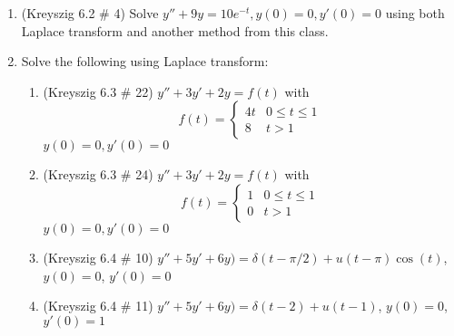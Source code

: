 \documentclass[letterpaper, fontsize=12pt]{scrartcl} %
\numberwithin{equation}{section} %
\numberwithin{figure}{section} %
\numberwithin{table}{section} %
\begin{document}
\begin{enumerate}
\item (Kreyszig 6.2 \# 4) Solve $y'' + 9y  = 10e^{-t}, y(0)=0, y'(0)=0$ using both Laplace transform and another method from this class. 

\item Solve the following using Laplace transform:
\begin{enumerate}
\item (Kreyszig 6.3 \# 22) $y'' +  3y' + 2y = f(t)$ with 
\[ f(t) = \begin{cases} 4t & 0\leq t\leq  1 \\ 8 & t> 1\end{cases}\]
$ y(0)= 0, y'(0) =0$

\item (Kreyszig 6.3 \# 24) $y'' +  3y' + 2y = f(t)$ with
\[ f(t) = \begin{cases} 1 & 0\leq t\leq  1 \\ 0 & t> 1\end{cases}\]
$ y(0)= 0, y'(0) =0$

\item (Kreyszig 6.4 \# 10) $y'' + 5y' + 6y) = \delta(t - \pi/2) + u(t - \pi)\cos(t)$, $y(0) = 0$, $y'(0) = 0$

\item (Kreyszig 6.4 \# 11) $y'' + 5y' + 6y) = \delta(t - 2) + u(t - 1)$, $y(0) = 0$, $y'(0) = 1$


\end{enumerate}

\end{enumerate}

\end{document}
